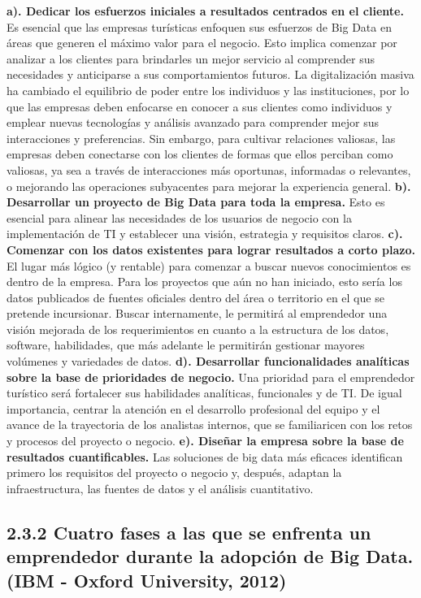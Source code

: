 \documentclass[
  letterpaper,
  DIV=11,
  numbers=noendperiod]{scrreprt}
\begin{document}
\textbf{a). Dedicar los esfuerzos iniciales a resultados centrados en el
cliente.} Es esencial que las empresas turísticas enfoquen sus esfuerzos
de Big Data en áreas que generen el máximo valor para el negocio. Esto
implica comenzar por analizar a los clientes para brindarles un mejor
servicio al comprender sus necesidades y anticiparse a sus
comportamientos futuros. La digitalización masiva ha cambiado el
equilibrio de poder entre los individuos y las instituciones, por lo que
las empresas deben enfocarse en conocer a sus clientes como individuos y
emplear nuevas tecnologías y análisis avanzado para comprender mejor sus
interacciones y preferencias. Sin embargo, para cultivar relaciones
valiosas, las empresas deben conectarse con los clientes de formas que
ellos perciban como valiosas, ya sea a través de interacciones más
oportunas, informadas o relevantes, o mejorando las operaciones
subyacentes para mejorar la experiencia general. \textbf{b). Desarrollar
un proyecto de Big Data para toda la empresa.} Esto es esencial para
alinear las necesidades de los usuarios de negocio con la implementación
de TI y establecer una visión, estrategia y requisitos claros.
\textbf{c). Comenzar con los datos existentes para lograr resultados a
corto plazo.} El lugar más lógico (y rentable) para comenzar a buscar
nuevos conocimientos es dentro de la empresa. Para los proyectos que aún
no han iniciado, esto sería los datos publicados de fuentes oficiales
dentro del área o territorio en el que se pretende incursionar. Buscar
internamente, le permitirá al emprendedor una visión mejorada de los
requerimientos en cuanto a la estructura de los datos, software,
habilidades, que más adelante le permitirán gestionar mayores volúmenes
y variedades de datos. \textbf{d). Desarrollar funcionalidades
analíticas sobre la base de prioridades de negocio.} Una prioridad para
el emprendedor turístico será fortalecer sus habilidades analíticas,
funcionales y de TI. De igual importancia, centrar la atención en el
desarrollo profesional del equipo y el avance de la trayectoria de los
analistas internos, que se familiaricen con los retos y procesos del
proyecto o negocio. \textbf{e). Diseñar la empresa sobre la base de
resultados cuantificables.} Las soluciones de big data más eficaces
identifican primero los requisitos del proyecto o negocio y, después,
adaptan la infraestructura, las fuentes de datos y el análisis
cuantitativo.

\hypertarget{cuatro-fases-a-las-que-se-enfrenta-un-emprendedor-durante-la-adopciuxf3n-de-big-data.-ibm---oxford-university-2012}{%
\subsection{2.3.2 Cuatro fases a las que se enfrenta un emprendedor
durante la adopción de Big Data. (IBM - Oxford University,
2012)}\label{cuatro-fases-a-las-que-se-enfrenta-un-emprendedor-durante-la-adopciuxf3n-de-big-data.-ibm---oxford-university-2012}}
\end{document}
